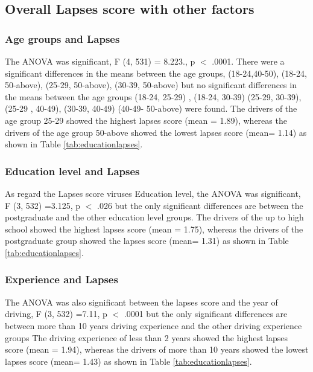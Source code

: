 \documentclass[preprint,12pt,a4paper,authoryear]{elsarticle}
\begin{document}
\begin{linenumbers}
\subsection{Overall Lapses score with other factors}

\subsubsection{Age groups and Lapses}

 The ANOVA was significant, F (4, 531) = 8.223., p $<$ .0001. There were  a significant differences in the means between the age groups, (18-24,40-50), (18-24, 50-above), (25-29, 50-above), (30-39, 50-above)  but no significant differences in the means between the age groups (18-24, 25-29) , (18-24, 30-39) (25-29, 30-39), (25-29 , 40-49), (30-39, 40-49)   (40-49- 50-above) were found. The drivers of the age group 25-29 showed the highest lapses score (mean = 1.89), whereas the drivers of the age group 50-above showed the lowest lapses score (mean= 1.14) as shown in Table \ref{tab:educationlapses}.

\subsubsection{Education level and Lapses}

As regard the Lapses score viruses Education level, the ANOVA was significant, F (3, 532) =3.125, p $<$ .026 but the only significant differences are between the postgraduate and the other education level groups. The drivers of the up to high school showed the highest lapses score (mean = 1.75), whereas the drivers of the postgraduate group showed the lapses score (mean= 1.31) as shown in Table \ref{tab:educationlapses}.

\subsubsection{Experience and Lapses}

The ANOVA was also significant between the lapses score and the year of driving, F (3, 532) =7.11, p $<$ .0001 but the only significant differences are between more than 10 years driving experience and the other driving experience groups The driving experience of less than 2 years showed the highest lapses score (mean = 1.94), whereas the drivers of more than 10 years showed the lowest lapses score (mean= 1.43) as shown in Table \ref{tab:educationlapses}.


\end{linenumbers}
\end{document}

